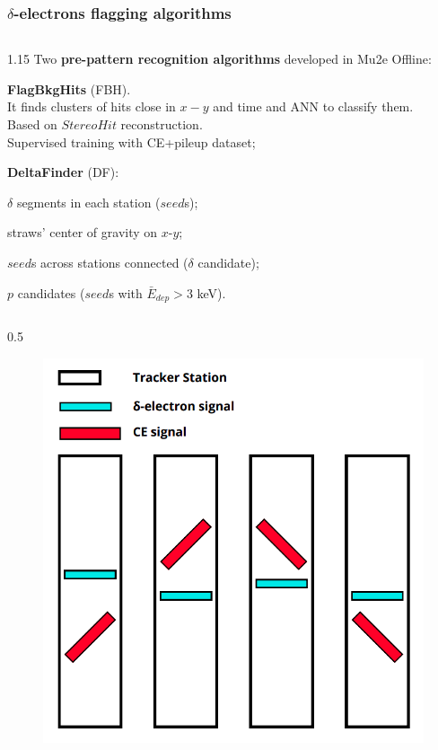 \documentclass{beamer}
\begin{document}
\begin{frame}
    \frametitle{$\delta$-electrons flagging algorithms}
      \begin{columns}
        \begin{column}{1.15\framewidth}
       {\footnotesize Two \textbf{pre-pattern recognition  algorithms} developed in Mu2e Offline:}
    \setlength{\leftmargini}{1.2em}
    \vspace{0.5mm}
    \begin{itemize}
    {\footnotesize   
    \item \textbf{FlagBkgHits} (FBH). \\ It finds clusters of hits close in $x-y$ and time and ANN to classify them. \\ Based on $StereoHit$ reconstruction. \\ Supervised training with CE+pileup dataset;
    \vspace{0.5mm}
    \item \textbf{DeltaFinder} (DF):
    }
    \begin{itemize}
        {\footnotesize \item $\delta$ segments in each station ($seed$s);
\item  straws' center of gravity on $x$-$y$; 
\item $seed$s across stations connected ($\delta$ candidate); 
\item $p$ candidates ($seed$s with $\bar{E}_{dep}> 3$ keV).}
    \end{itemize}
    \end{itemize}
    \end{column}
    \end{columns}
    \vspace{-3mm}
        \begin{columns}
        \begin{column}{0.5\framewidth}
            \begin{figure}[!h]
        \centering
        \hspace*{-2em}
        \includegraphics[width =0.6\columnwidth]{figures/png/Screenshot_20240811_123048.png}

\end{figure}
\end{column}
\end{columns}
\end{frame}
\end{document}
